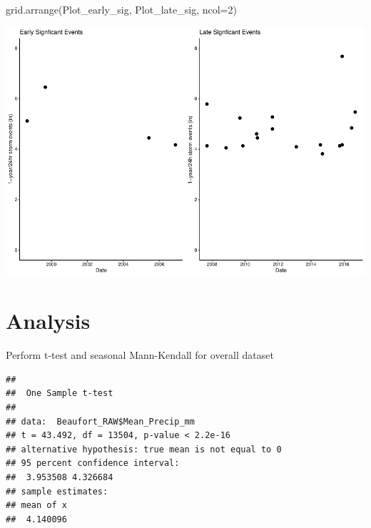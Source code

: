 \documentclass[
  12pt,
]{article}
\newenvironment{Shaded}{\begin{snugshade}}{\end{snugshade}}
\newcommand{\AttributeTok}[1]{\textcolor[rgb]{0.77,0.63,0.00}{#1}}
\newcommand{\DecValTok}[1]{\textcolor[rgb]{0.00,0.00,0.81}{#1}}
\newcommand{\FunctionTok}[1]{\textcolor[rgb]{0.00,0.00,0.00}{#1}}
\newcommand{\NormalTok}[1]{#1}
\newcommand{\SpecialCharTok}[1]{\textcolor[rgb]{0.00,0.00,0.00}{#1}}
\begin{document}
\begin{Shaded}
\begin{Highlighting}[]
\FunctionTok{grid.arrange}\NormalTok{(Plot\_early\_sig, Plot\_late\_sig, }\AttributeTok{ncol=}\DecValTok{2}\NormalTok{)}
\end{Highlighting}
\end{Shaded}

\includegraphics{Project_Template_TLK_files/figure-latex/combined one year storms-1.pdf}

\newpage

\hypertarget{analysis}{%
\section{Analysis}\label{analysis}}

Perform t-test and seasonal Mann-Kendall for overall dataset

\begin{Shaded}
\end{Shaded}

\begin{verbatim}
## 
##  One Sample t-test
## 
## data:  Beaufort_RAW$Mean_Precip_mm
## t = 43.492, df = 13504, p-value < 2.2e-16
## alternative hypothesis: true mean is not equal to 0
## 95 percent confidence interval:
##  3.953508 4.326684
## sample estimates:
## mean of x 
##  4.140096
\end{verbatim}
\end{document}
